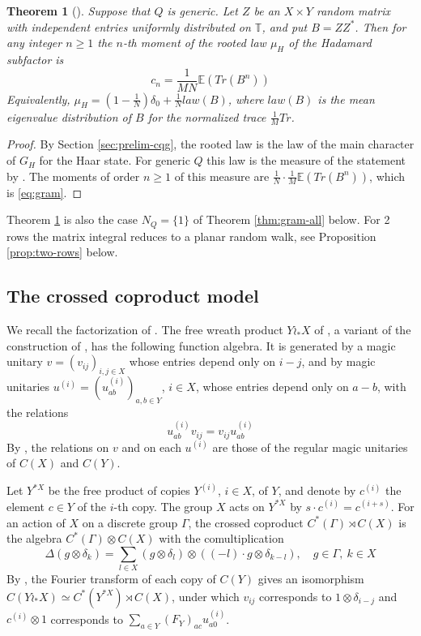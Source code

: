 \documentclass[11pt,reqno]{amsart}
\newtheorem{thm}{Theorem}[section]
\theoremstyle{definition}
\numberwithin{equation}{section}
\begin{document}
\begin{thm}[\cite{BBi15}]\label{thm:gram}
Suppose that $Q$ is generic. Let $Z$ be an $X\times Y$ random matrix with independent entries uniformly distributed on $\mathbb T$, and put $B=ZZ^*$. Then for any integer $n\geq1$ the $n$-th moment of the rooted law $\mu_H$ of the Hadamard subfactor is
\begin{equation}\label{eq:gram}
c_n=\frac1{MN}\mathbb E(Tr(B^n))
\end{equation}
Equivalently, $\mu_H=(1-\frac1N)\delta_0+\frac1N law(B)$, where $law(B)$ is the mean eigenvalue distribution of $B$ for the normalized trace $\frac1M Tr$.
\end{thm}
\begin{proof}
By Section \ref{sec:prelim-cqg}, the rooted law is the law of the main character of $G_H$ for the Haar state. For generic $Q$ this law is the measure of the statement by \cite[Theorem 4.6 and Proposition 5.2]{BBi15}. The moments of order $n\geq1$ of this measure are $\frac1N\cdot\frac1M\mathbb E(Tr(B^n))$, which is \eqref{eq:gram}.
\end{proof}

Theorem \ref{thm:gram} is also the case $N_Q=\{1\}$ of Theorem \ref{thm:gram-all} below. For 2 rows the matrix integral reduces to a planar random walk, see Proposition \ref{prop:two-rows} below.

\subsection{The crossed coproduct model}

We recall the factorization of \cite[Section 3]{BBi15}. The free wreath product $Y \wr_* X$ of \cite[Definition 3.4]{BBi15}, a variant of the construction of \cite{Bic04}, has the following function algebra. It is generated by a magic unitary $v=(v_{ij})_{i,j\in X}$ whose entries depend only on $i-j$, and by magic unitaries $u^{(i)}=(u^{(i)}_{ab})_{a,b\in Y}$, $i\in X$, whose entries depend only on $a-b$, with the relations
$$u^{(i)}_{ab}v_{ij}=v_{ij}u^{(i)}_{ab}$$
By \cite[Lemma 3.5]{BBi15}, the relations on $v$ and on each $u^{(i)}$ are those of the regular magic unitaries of $C(X)$ and $C(Y)$.

Let $Y^{*X}$ be the free product of copies $Y^{(i)}$, $i\in X$, of $Y$, and denote by $c^{(i)}$ the element $c\in Y$ of the $i$-th copy. The group $X$ acts on $Y^{*X}$ by $s\cdot c^{(i)}=c^{(i+s)}$. For an action of $X$ on a discrete group $\Gamma$, the crossed coproduct $C^*(\Gamma)\rtimes C(X)$ is the algebra $C^*(\Gamma)\otimes C(X)$ with the comultiplication \cite[Definition 3.7]{BBi15}
\begin{equation}\label{eq:dita-coproduct}
\Delta(g\otimes\delta_k)=\sum_{l\in X}
(g\otimes\delta_l)\otimes((-l)\cdot g\otimes\delta_{k-l}),
\quad g\in\Gamma,\ k\in X
\end{equation}
By \cite[Lemma 3.8]{BBi15}, the Fourier transform of each copy of $C(Y)$ gives an isomorphism $C(Y \wr_* X)\simeq C^*(Y^{*X})\rtimes C(X)$, under which $v_{ij}$ corresponds to $1\otimes\delta_{i-j}$ and $c^{(i)}\otimes1$ corresponds to $\sum_{a\in Y}(F_Y)_{ac}u^{(i)}_{a0}$.
\end{document}
